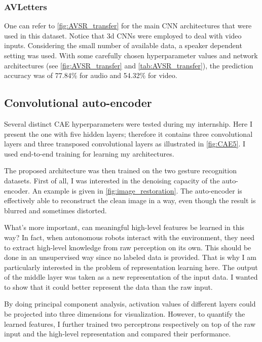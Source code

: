 \subsubsection{AVLetters}

One can refer to \autoref{fig:AVSR_transfer} for the main CNN architectures
that were used in this dataset. 
Notice that 3d CNNs were employed to deal with video inputs.
Considering the small number of available data, a speaker dependent
setting was used.
With some carefully chosen hyperparameter values and network architectures
(see \autoref{fig:AVSR_transfer} and \autoref{tab:AVSR_transfer}),
the prediction accuracy was of 77.84\% for audio and 54.32\% for video.

\subsection{Convolutional auto-encoder} \label{subsection:CAE}

Several distinct CAE hyperparameters were tested during my internship.
Here I present the one with five hidden layers; therefore it contains
three convolutional layers and three transposed convolutional layers
as illustrated in \autoref{fig:CAE5}. I used end-to-end training for
learning my architectures.

The proposed architecture was then trained on the two gesture recognition
datasets. First of all, I was interested in the denoising capacity of
the auto-encoder. An example is given in \autoref{fig:image_restoration}.
The auto-encoder is effectively able to reconstruct the clean image in
a way, even though the result is blurred and sometimes distorted.

What's more important, can meaningful high-level features be
learned in this way? 
In fact, when autonomous robots interact with the environment, they need
to extract high-level knowledge from raw perception on its own.
This should be done in an unsupervised way since no labeled data
is provided.
That is why I am particularly interested in the problem of representation
learning here. The output of the middle layer was taken as a new
representation of the input data.
I wanted to show that it could better represent the data than the raw input.

By doing principal component analysis, activation values of different
layers could be projected into three dimensions for visualization.
However, to quantify the learned features, I further trained two perceptrons
respectively on top of the raw input and the high-level representation
and compared their performance.


